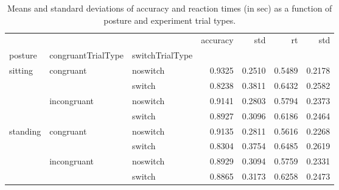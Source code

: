 \begin{table}
\centering
\caption{Means and standard deviations of accuracy and reaction times (in sec) as a function of posture and experiment trial types.}
\label{table-task-switching-replication-reaction-time}
\begin{tabular}{lllrrrr}
\toprule
         &             &        & accuracy &    std &     rt &    std \\
posture & congruantTrialType & switchTrialType &          &        &        &        \\
\midrule
sitting & congruant & noswitch &   0.9325 & 0.2510 & 0.5489 & 0.2178 \\
         &             & switch &   0.8238 & 0.3811 & 0.6432 & 0.2582 \\
         & incongruant & noswitch &   0.9141 & 0.2803 & 0.5794 & 0.2373 \\
         &             & switch &   0.8927 & 0.3096 & 0.6186 & 0.2464 \\
standing & congruant & noswitch &   0.9135 & 0.2811 & 0.5616 & 0.2268 \\
         &             & switch &   0.8304 & 0.3754 & 0.6485 & 0.2619 \\
         & incongruant & noswitch &   0.8929 & 0.3094 & 0.5759 & 0.2331 \\
         &             & switch &   0.8865 & 0.3173 & 0.6258 & 0.2473 \\
\bottomrule
\end{tabular}
\end{table}

